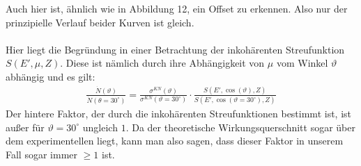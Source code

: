 \documentclass[german,  %
parskip=full,  %
]{scrartcl}
\begin{document}
Auch hier ist, ähnlich wie in Abbildung 12, ein Offset zu erkennen. Also nur der prinzipielle Verlauf beider Kurven ist gleich.
\\\\
Hier liegt die Begründung in einer Betrachtung der inkohärenten Streufunktion $S(E', \mu, Z)$. Diese ist nämlich durch ihre Abhängigkeit von $\mu$ vom Winkel $\vartheta$ abhängig und es gilt:
\begin{align}
\frac{\dot{N} (\vartheta)}{\dot{N} (\theta=30^{\circ})} = \frac{\sigma^{KN} (\vartheta)}{\sigma^{KN}(\vartheta=30^{\circ})} \cdot \frac{S (E', \cos(\vartheta), Z)}{S (E', \cos(\vartheta=30^{\circ}), Z)}
\end{align}
Der hintere Faktor, der durch die inkohärenten Streufunktionen bestimmt ist, ist außer für $\vartheta=30^{\circ}$ ungleich $1$. Da der theoretische Wirkungsquerschnitt sogar über dem experimentellen liegt, kann man also sagen, dass dieser Faktor in unserem Fall sogar immer $\geq 1$ ist.
\end{document}
